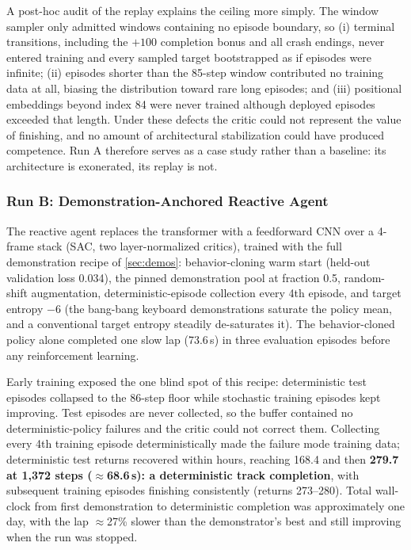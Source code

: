 \documentclass[conference]{IEEEtran}
\begin{document}
A post-hoc audit of the replay explains the ceiling more simply. The window sampler only admitted windows containing no episode boundary, so (i) terminal transitions, including the $+100$ completion bonus and all crash endings, never entered training and every sampled target bootstrapped as if episodes were infinite; (ii) episodes shorter than the 85-step window contributed no training data at all, biasing the distribution toward rare long episodes; and (iii) positional embeddings beyond index 84 were never trained although deployed episodes exceeded that length. Under these defects the critic could not represent the value of finishing, and no amount of architectural stabilization could have produced competence. Run A therefore serves as a case study rather than a baseline: its architecture is exonerated, its replay is not.



\subsubsection{Run B: Demonstration-Anchored Reactive Agent}

\label{sec:runb}

The reactive agent replaces the transformer with a feedforward CNN over a 4-frame stack (SAC, two layer-normalized critics), trained with the full demonstration recipe of \cref{sec:demos}: behavior-cloning warm start (held-out validation loss 0.034), the pinned demonstration pool at fraction 0.5, random-shift augmentation, deterministic-episode collection every 4th episode, and target entropy $-6$ (the bang-bang keyboard demonstrations saturate the policy mean, and a conventional target entropy steadily de-saturates it). The behavior-cloned policy alone completed one slow lap (73.6\,s) in three evaluation episodes before any reinforcement learning.



Early training exposed the one blind spot of this recipe: deterministic test episodes collapsed to the 86-step floor while stochastic training episodes kept improving. Test episodes are never collected, so the buffer contained no deterministic-policy failures and the critic could not correct them. Collecting every 4th training episode deterministically made the failure mode training data; deterministic test returns recovered within hours, reaching 168.4 and then \textbf{279.7 at 1{,}372 steps ($\approx$68.6\,s): a deterministic track completion}, with subsequent training episodes finishing consistently (returns 273--280). Total wall-clock from first demonstration to deterministic completion was approximately one day, with the lap $\approx$27\% slower than the demonstrator's best and still improving when the run was stopped.
\end{document}
